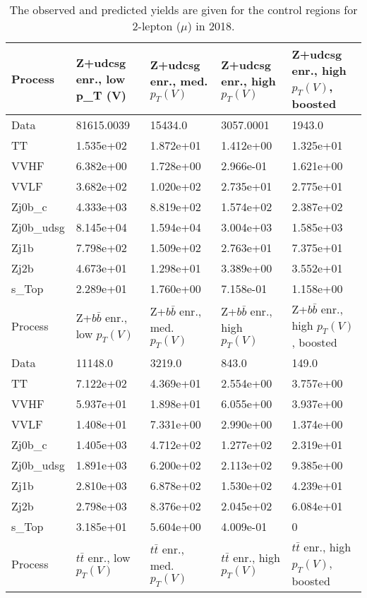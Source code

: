 \begin{table}
\centering
\caption[2018 2-lepton ($\mu$) control region yields]{
                  The observed and predicted yields are given for the
                  control regions for 2-lepton ($\mu$) in 2018.
                  }
{\footnotesize
\begin{tabularx}{\textwidth}{|X|X|X|X|X|}
\hline
Process & Z+udcsg enr., low p_{T} (V) & Z+udcsg enr., med. $p_{T}(V)$ & Z+udcsg enr., high $p_{T}(V)$ & Z+udcsg enr., high $p_{T}(V)$, boosted \\
\hline
Data & 81615.0039 & 15434.0 & 3057.0001 & 1943.0 \\
\hline
TT & 1.535e+02 & 1.872e+01 & 1.412e+00 & 1.325e+01 \\
VVHF & 6.382e+00 & 1.728e+00 & 2.966e-01 & 1.621e+00 \\
VVLF & 3.682e+02 & 1.020e+02 & 2.735e+01 & 2.775e+01 \\
Zj0b\_c & 4.333e+03 & 8.819e+02 & 1.574e+02 & 2.387e+02 \\
Zj0b\_udsg & 8.145e+04 & 1.594e+04 & 3.004e+03 & 1.585e+03 \\
Zj1b & 7.798e+02 & 1.509e+02 & 2.763e+01 & 7.375e+01 \\
Zj2b & 4.673e+01 & 1.298e+01 & 3.389e+00 & 3.552e+01 \\
s\_Top & 2.289e+01 & 1.760e+00 & 7.158e-01 & 1.158e+00 \\
\hline
\hline
Process & Z+$b\bar{b}$ enr., low $p_{T}(V)$ & Z+$b\bar{b}$ enr., med. $p_{T}(V)$ & Z+$b\bar{b}$ enr., high $p_{T}(V)$ & Z+$b\bar{b}$ enr., high $p_{T}(V)$, boosted \\
\hline
Data & 11148.0 & 3219.0 & 843.0 & 149.0 \\
\hline
TT & 7.122e+02 & 4.369e+01 & 2.554e+00 & 3.757e+00 \\
VVHF & 5.937e+01 & 1.898e+01 & 6.055e+00 & 3.937e+00 \\
VVLF & 1.408e+01 & 7.331e+00 & 2.990e+00 & 1.374e+00 \\
Zj0b\_c & 1.405e+03 & 4.712e+02 & 1.277e+02 & 2.319e+01 \\
Zj0b\_udsg & 1.891e+03 & 6.200e+02 & 2.113e+02 & 9.385e+00 \\
Zj1b & 2.810e+03 & 6.878e+02 & 1.530e+02 & 4.239e+01 \\
Zj2b & 2.798e+03 & 8.376e+02 & 2.045e+02 & 6.084e+01 \\
s\_Top & 3.185e+01 & 5.604e+00 & 4.009e-01 & 0 \\
\hline
\hline
Process & $t\bar{t}$ enr., low $p_{T}(V)$ & $t\bar{t}$ enr., med. $p_{T}(V)$ & $t\bar{t}$ enr., high $p_{T}(V)$ & $t\bar{t}$ enr., high $p_{T}(V)$, boosted \\

\end{tabularx}}
\end{table}
